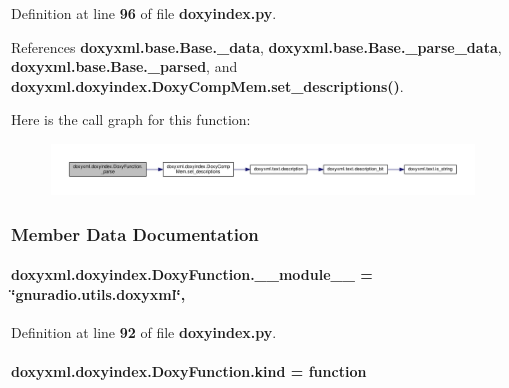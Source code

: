 Definition at line {\bf 96} of file {\bf doxyindex.\+py}.



References {\bf doxyxml.\+base.\+Base.\+\_\+data}, {\bf doxyxml.\+base.\+Base.\+\_\+parse\+\_\+data}, {\bf doxyxml.\+base.\+Base.\+\_\+parsed}, and {\bf doxyxml.\+doxyindex.\+Doxy\+Comp\+Mem.\+set\+\_\+descriptions()}.



Here is the call graph for this function\+:
\nopagebreak
\begin{figure}[H]
\begin{center}
\leavevmode
\includegraphics[width=350pt]{d2/d46/classdoxyxml_1_1doxyindex_1_1DoxyFunction_a82cc0755aac6f2435b0d4c884291ae65_cgraph}
\end{center}
\end{figure}




\subsubsection{Member Data Documentation}
\paragraph[{\+\_\+\+\_\+module\+\_\+\+\_\+}]{ doxyxml.\+doxyindex.\+Doxy\+Function.\+\_\+\+\_\+module\+\_\+\+\_\+ = \char`\"{}gnuradio.\+utils.\+doxyxml\char`\"{}\hspace{0.3cm}{\ttfamily [static]}, {\ttfamily [private]}}\label{classdoxyxml_1_1doxyindex_1_1DoxyFunction_ad2972d9515120bdf2ab491af662779b4}


Definition at line {\bf 92} of file {\bf doxyindex.\+py}.

\paragraph[{kind}]{ doxyxml.\+doxyindex.\+Doxy\+Function.\+kind = \textquotesingle{}function\textquotesingle{}\hspace{0.3cm}{\ttfamily [static]}}\label{classdoxyxml_1_1doxyindex_1_1DoxyFunction_ab739f9ea93ada2670f531fcbc1e0d06a}


